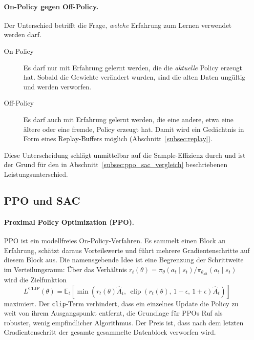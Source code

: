 \paragraph{On-Policy gegen Off-Policy.}
Der Unterschied betrifft die Frage, \emph{welche} Erfahrung zum Lernen verwendet werden darf.
\begin{description}
  \item[On-Policy] Es darf nur mit Erfahrung gelernt werden, die die \emph{aktuelle} Policy erzeugt hat. Sobald die Gewichte verändert wurden, sind die alten Daten ungültig und werden verworfen.
  \item[Off-Policy] Es darf auch mit Erfahrung gelernt werden, die eine andere, etwa eine ältere oder eine fremde, Policy erzeugt hat. Damit wird ein Gedächtnis in Form eines Replay-Buffers möglich (Abschnitt~\ref{subsec:replay}).
\end{description}
Diese Unterscheidung schlägt unmittelbar auf die Sample-Effizienz durch und ist der Grund für den in Abschnitt~\ref{subsec:ppo_sac_vergleich} beschriebenen Leistungsunterschied.

\subsection{PPO und SAC}
\label{subsec:ppo_sac}

\paragraph{Proximal Policy Optimization (PPO).}
\ac{PPO} \cite{schulman2017proximal} ist ein modellfreies On-Policy-Verfahren. Es sammelt einen Block an Erfahrung, schätzt daraus Vorteilswerte und führt mehrere Gradientenschritte auf diesem Block aus. Die namensgebende Idee ist eine Begrenzung der Schrittweite im Verteilungsraum: Über das Verhältnis $r_t(\theta) = \pi_\theta(a_t \mid s_t) / \pi_{\theta_{\text{alt}}}(a_t \mid s_t)$ wird die Zielfunktion
\begin{equation}
  L^{\text{CLIP}}(\theta) = \mathbb{E}_t\!\left[ \min\!\left( r_t(\theta)\hat{A}_t,\ \operatorname{clip}\!\left(r_t(\theta),\, 1-\epsilon,\, 1+\epsilon\right)\hat{A}_t \right) \right]
  \label{eq:ppo}
\end{equation}
maximiert. Der \texttt{clip}-Term verhindert, dass ein einzelnes Update die Policy zu weit von ihrem Ausgangspunkt entfernt, die Grundlage für \ac{PPO}s Ruf als robuster, wenig empfindlicher Algorithmus. Der Preis ist, dass nach dem letzten Gradientenschritt der gesamte gesammelte Datenblock verworfen wird.

